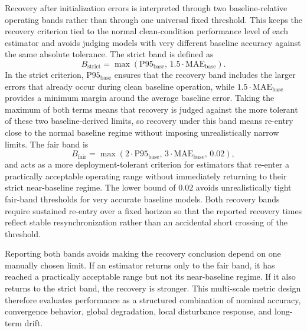 \documentclass[
    a4paper,
    12pt,
    titlepage,
    bibliography=totoc,
    twoside=on,
    parskip=false,
    numbers=noenddot,
    cleardoublepage=empty,
    DIV=12,
    BCOR=12.0mm,
    headheight=36pt,
    headings=openright
]{scrreprt}
\begin{document}
Recovery after initialization errors is interpreted through two baseline-relative operating bands rather than through one universal fixed threshold. This keeps the recovery criterion tied to the normal clean-condition performance level of each estimator and avoids judging models with very different baseline accuracy against the same absolute tolerance. The strict band is defined as
\begin{equation}
    B_{\mathrm{strict}}
    =
    \max\!\left(\mathrm{P95}_{\mathrm{base}},\,1.5\cdot\mathrm{MAE}_{\mathrm{base}}\right).
    \label{eq:robustness_strict_band}
\end{equation}
In the strict criterion, $\mathrm{P95}_{\mathrm{base}}$ ensures that the recovery band includes the larger errors that already occur during clean baseline operation, while $1.5 \cdot \mathrm{MAE}_{\mathrm{base}}$ provides a minimum margin around the average baseline error. Taking the maximum of both terms means that recovery is judged against the more tolerant of these two baseline-derived limits, so recovery under this band means re-entry close to the normal baseline regime without imposing unrealistically narrow limits. The fair band is
\begin{equation}
    B_{\mathrm{fair}}
    =
    \max\!\left(2\cdot\mathrm{P95}_{\mathrm{base}},\,3\cdot\mathrm{MAE}_{\mathrm{base}},\,0.02\right),
    \label{eq:robustness_fair_band}
\end{equation}
and acts as a more deployment-tolerant criterion for estimators that re-enter a practically acceptable operating range without immediately returning to their strict near-baseline regime. The lower bound of $0.02$ avoids unrealistically tight fair-band thresholds for very accurate baseline models. Both recovery bands require sustained re-entry over a fixed horizon so that the reported recovery times reflect stable resynchronization rather than an accidental short crossing of the threshold.

Reporting both bands avoids making the recovery conclusion depend on one manually chosen limit. If an estimator returns only to the fair band, it has reached a practically acceptable range but not its near-baseline regime. If it also returns to the strict band, the recovery is stronger. This multi-scale metric design therefore evaluates performance as a structured combination of nominal accuracy, convergence behavior, global degradation, local disturbance response, and long-term drift.
\end{document}
